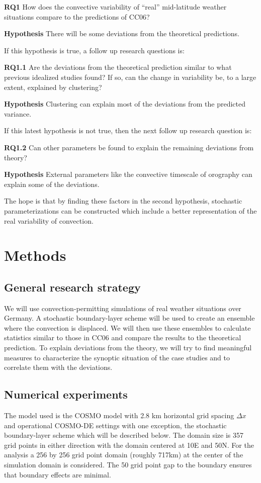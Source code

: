 \documentclass[a4paper, 12pt]{article}
\begin{document}
\textbf{RQ1} How does the convective variability of ``real'' mid-latitude weather situations compare to the predictions of CC06?

\textbf{Hypothesis} There will be some deviations from the theoretical predictions. 

If this hypothesis is true, a follow up research questions is:

\textbf{RQ1.1} Are the deviations from the theoretical prediction similar to what previous idealized studies found? If so, can the change in variability be, to a large extent, explained by clustering?

\textbf{Hypothesis} Clustering can explain most of the deviations from the predicted variance.

If this latest hypothesis is not true, then the next follow up research question is:

\textbf{RQ1.2} Can other parameters be found to explain the remaining deviations from theory?

\textbf{Hypothesis} External parameters like the convective timescale of orography can explain some of the deviations.

The hope is that by finding these factors in the second hypothesis, stochastic parameterizations can be constructed which include a better representation of the real variability of convection. 

\section{Methods}

\subsection{General research strategy}
We will use convection-permitting simulations of real weather situations over Germany. A stochastic boundary-layer scheme will be used to create an ensemble where the convection is displaced. We will then use these ensembles to calculate statistics similar to those in CC06 and compare the results to the theoretical prediction. To explain deviations from the theory, we will try to find meaningful measures to characterize the synoptic situation of the case studies and to correlate them with the deviations.  

\subsection{Numerical experiments}
The model used is the COSMO model with 2.8 km horizontal grid spacing $\Delta x$ and operational COSMO-DE settings with one exception, the stochastic boundary-layer scheme which will be described below. The domain size is 357 grid points in either direction with the domain centered at 10E and 50N. For the analysis a 256 by 256 grid point domain (roughly 717km) at the center of the simulation domain is considered. The 50 grid point gap to the boundary ensures that boundary effects are minimal. 
\end{document}
